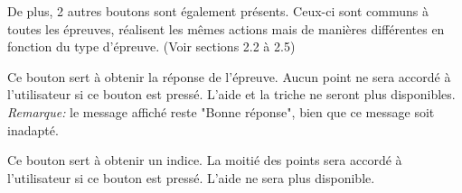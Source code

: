 \documentclass[11pt]{scrreprt}
\begin{document}
    De plus, 2 autres boutons sont également présents. Ceux-ci sont communs à toutes les épreuves, réalisent les mêmes actions mais de manières différentes en fonction du type d'épreuve. (Voir sections 2.2 à 2.5)
    \begin{description}[style=nextline]
        \item[Bouton de triche]Ce bouton sert à obtenir la réponse de l'épreuve. Aucun point ne sera accordé à l'utilisateur si ce bouton est pressé. L'aide et la triche ne seront plus disponibles. \textit{Remarque: } le message affiché reste "Bonne réponse", bien que ce message soit inadapté.
        \item[Bouton d'aide]Ce bouton sert à obtenir un indice. La moitié des points sera accordé à l'utilisateur si ce bouton est pressé. L'aide ne sera plus disponible.
    \end{description}
\end{document}

